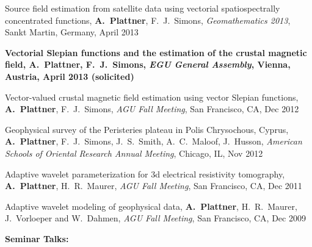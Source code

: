 \documentclass[10pt]{article}
\begin{document}
\spcp
Source field estimation from satellite data using vectorial spatiospectrally 
concentrated functions,
\textbf{A.~Plattner}, F.~J.~Simons,
\emph{Geomathematics 2013}, Sankt Martin, Germany, April 2013

\spcp
\textbf{Vectorial Slepian functions and the estimation of the crustal magnetic field,
A.~Plattner, F.~J.~Simons,
\emph{EGU General Assembly}, Vienna, Austria, April 2013 (solicited)}

\spcp
Vector-valued crustal magnetic field estimation using vector Slepian functions,
\textbf{A.~Plattner}, F.~J.~Simons,
\emph{AGU Fall Meeting}, San Francisco, CA, Dec 2012

\spcp
Geophysical survey of the Peristeries plateau in Polis Chrysochous, Cyprus,
\textbf{A.~Plattner}, F.~J.~Simons, J.~S.~Smith, A.~C.~Maloof, J.~Husson,
\emph{American Schools of Oriental Research Annual Meeting}, Chicago, IL, Nov 2012

\spcp
Adaptive wavelet parameterization for 3d electrical resistivity tomography,
\textbf{A.~Plattner}, H.~R.~Maurer, 
\emph{AGU Fall Meeting}, San Francisco, CA, Dec 2011

\spcp
Adaptive wavelet modeling of geophysical data,
\textbf{A.~Plattner}, H.~R.~Maurer, J.~Vorloeper and W.~Dahmen, 
\emph{AGU Fall Meeting}, San Francisco, CA, Dec 2009



\clearpage
\textbf{\tsize Seminar Talks:}
\end{document}
